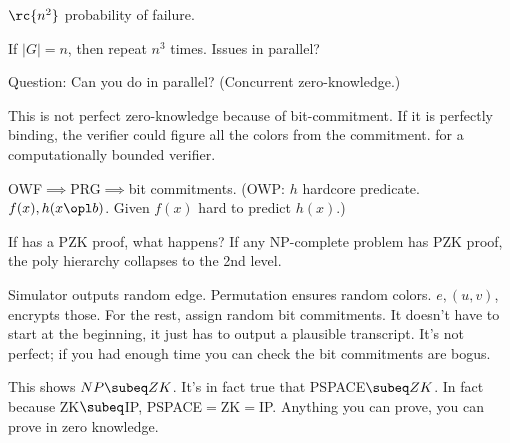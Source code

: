 $\rc{n^2}$ probability of failure.

If $|G|=n$, then repeat $n^3$ times. Issues in parallel?

Question: Can you do in parallel? (Concurrent zero-knowledge.)

This is not perfect zero-knowledge because of bit-commitment. If it is perfectly binding, the verifier could figure all the colors from the commitment. for a computationally bounded verifier.

OWF$\implies$PRG$\implies$bit commitments. (OWP: $h$ hardcore predicate. $f(x),h(x\opl b)$. Given $f(x)$ hard to predict $h(x)$.)

If has a PZK proof, what happens? If any NP-complete problem has PZK proof, the poly hierarchy collapses to the 2nd level.

Simulator outputs random edge. Permutation ensures random colors. $e, (u,v)$, encrypts those. For the rest, assign random bit commitments. It doesn't have to start at the beginning, it just has to output a plausible transcript. It's not perfect; if you had enough time you can check the bit commitments are bogus. %

%

This shows $NP\subeq ZK$. It's in fact true that PSPACE$\subeq ZK$. In fact because ZK$\subeq$IP, PSPACE$=$ZK$=$IP. Anything you can prove, you can prove in zero knowledge.

